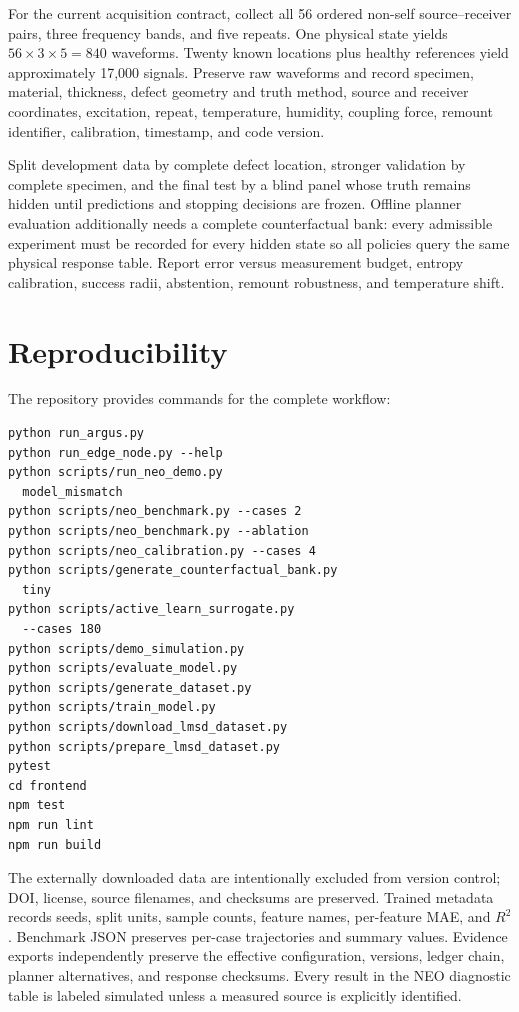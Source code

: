 \documentclass[conference]{IEEEtran}
\begin{document}
For the current acquisition contract, collect all 56 ordered non-self source--receiver pairs, three frequency bands, and five repeats. One physical state yields $56\times3\times5=840$ waveforms. Twenty known locations plus healthy references yield approximately 17,000 signals. Preserve raw waveforms and record specimen, material, thickness, defect geometry and truth method, source and receiver coordinates, excitation, repeat, temperature, humidity, coupling force, remount identifier, calibration, timestamp, and code version.

Split development data by complete defect location, stronger validation by complete specimen, and the final test by a blind panel whose truth remains hidden until predictions and stopping decisions are frozen. Offline planner evaluation additionally needs a complete counterfactual bank: every admissible experiment must be recorded for every hidden state so all policies query the same physical response table. Report error versus measurement budget, entropy calibration, success radii, abstention, remount robustness, and temperature shift.

\section{Reproducibility}
The repository provides commands for the complete workflow:
\begin{scriptsize}
\begin{verbatim}
python run_argus.py
python run_edge_node.py --help
python scripts/run_neo_demo.py
  model_mismatch
python scripts/neo_benchmark.py --cases 2
python scripts/neo_benchmark.py --ablation
python scripts/neo_calibration.py --cases 4
python scripts/generate_counterfactual_bank.py
  tiny
python scripts/active_learn_surrogate.py
  --cases 180
python scripts/demo_simulation.py
python scripts/evaluate_model.py
python scripts/generate_dataset.py
python scripts/train_model.py
python scripts/download_lmsd_dataset.py
python scripts/prepare_lmsd_dataset.py
pytest
cd frontend
npm test
npm run lint
npm run build
\end{verbatim}
\end{scriptsize}
The externally downloaded data are intentionally excluded from version control; DOI, license, source filenames, and checksums are preserved. Trained metadata records seeds, split units, sample counts, feature names, per-feature MAE, and $R^2$. Benchmark JSON preserves per-case trajectories and summary values. Evidence exports independently preserve the effective configuration, versions, ledger chain, planner alternatives, and response checksums. Every result in the NEO diagnostic table is labeled simulated unless a measured source is explicitly identified.
\end{document}
